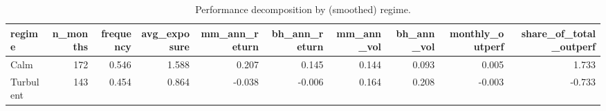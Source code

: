 \begin{table}[htbp]
\centering
\caption{Performance decomposition by (smoothed) regime.}
\label{tab:regimedecomp}
\small
\begin{tabular}{lrrrrrrrrr}
\toprule
regime & n\_months & frequency & avg\_exposure & mm\_ann\_return & bh\_ann\_return & mm\_ann\_vol & bh\_ann\_vol & monthly\_outperf & share\_of\_total\_outperf \\
\midrule
Calm & 172 & 0.546 & 1.588 & 0.207 & 0.145 & 0.144 & 0.093 & 0.005 & 1.733 \\
Turbulent & 143 & 0.454 & 0.864 & -0.038 & -0.006 & 0.164 & 0.208 & -0.003 & -0.733 \\
\bottomrule
\end{tabular}
\end{table}
